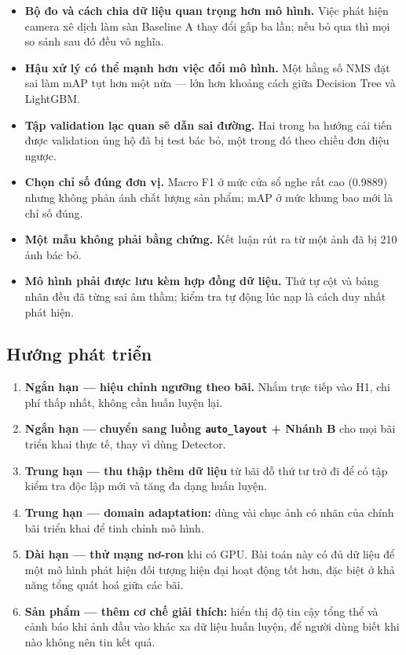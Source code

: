 \documentclass[12pt]{ai_conquer2026}
\begin{document}
\begin{itemize}
\item \textbf{Bộ đo và cách chia dữ liệu quan trọng hơn mô hình.} Việc phát hiện camera xê dịch làm sàn Baseline A thay đổi gấp ba lần; nếu bỏ qua thì mọi so sánh sau đó đều vô nghĩa.
\item \textbf{Hậu xử lý có thể mạnh hơn việc đổi mô hình.} Một hằng số NMS đặt sai làm mAP tụt hơn một nửa --- lớn hơn khoảng cách giữa Decision Tree và LightGBM.
\item \textbf{Tập validation lạc quan sẽ dẫn sai đường.} Hai trong ba hướng cải tiến được validation ủng hộ đã bị test bác bỏ, một trong đó theo chiều đơn điệu ngược.
\item \textbf{Chọn chỉ số đúng đơn vị.} Macro F1 ở mức cửa sổ nghe rất cao (0.9889) nhưng không phản ánh chất lượng sản phẩm; mAP ở mức khung bao mới là chỉ số đúng.
\item \textbf{Một mẫu không phải bằng chứng.} Kết luận rút ra từ một ảnh đã bị 210 ảnh bác bỏ.
\item \textbf{Mô hình phải được lưu kèm hợp đồng dữ liệu.} Thứ tự cột và bảng nhãn đều đã từng sai âm thầm; kiểm tra tự động lúc nạp là cách duy nhất phát hiện.
\end{itemize}

\subsection{Hướng phát triển}

\begin{enumerate}
\item \textbf{Ngắn hạn --- hiệu chỉnh ngưỡng theo bãi.} Nhắm trực tiếp vào H1, chi phí thấp nhất, không cần huấn luyện lại.
\item \textbf{Ngắn hạn --- chuyển sang luồng \texttt{auto\_layout} + Nhánh B} cho mọi bãi triển khai thực tế, thay vì dùng Detector.
\item \textbf{Trung hạn --- thu thập thêm dữ liệu} từ bãi đỗ thứ tư trở đi để có tập kiểm tra độc lập mới và tăng đa dạng huấn luyện.
\item \textbf{Trung hạn --- domain adaptation:} dùng vài chục ảnh có nhãn của chính bãi triển khai để tinh chỉnh mô hình.
\item \textbf{Dài hạn --- thử mạng nơ-ron} khi có GPU. Bài toán này có đủ dữ liệu để một mô hình phát hiện đối tượng hiện đại hoạt động tốt hơn, đặc biệt ở khả năng tổng quát hoá giữa các bãi.
\item \textbf{Sản phẩm --- thêm cơ chế giải thích:} hiển thị độ tin cậy tổng thể và cảnh báo khi ảnh đầu vào khác xa dữ liệu huấn luyện, để người dùng biết khi nào không nên tin kết quả.
\end{enumerate}
\end{document}
